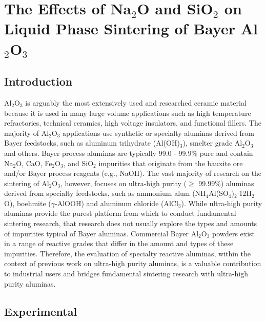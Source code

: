 \chapter{The Effects of Na$_{2}$O and SiO$_{2}$ on Liquid Phase Sintering of Bayer Al$_{2}$O$_{3}$}

\section{Introduction}
Al$_{2}$O$_{3}$ is arguably the most extensively used and researched ceramic material because it is used in many large volume applications such as high temperature refractories, technical ceramics, high voltage insulators, and functional fillers. The majority of Al$_{2}$O$_{3}$ applications use synthetic or specialty aluminas derived from Bayer feedstocks, such as aluminum trihydrate (Al(OH)$_{3}$), smelter grade Al$_{2}$O$_{3}$ and others. Bayer process aluminas are typically 99.0 - 99.9\% pure and contain Na$_{2}$O, CaO, Fe$_{2}$O$_{3}$, and SiO$_{2}$ impurities that originate from the bauxite ore and/or Bayer process reagents (e.g., NaOH). The vast majority of research on the sintering of Al$_{2}$O$_{3}$, however, focuses on ultra-high purity ($\geq$ 99.99\%) aluminas derived from specialty feedstocks, such as ammonium alum (NH$_{4}$Al(SO$_{4}$)$_{2}$$\cdot$12H$_{2}$O), boehmite ($\gamma$-AlOOH) and aluminum chloride (AlCl$_{3}$). While ultra-high purity aluminas provide the purest platform from which to conduct fundamental sintering research, that research does not usually explore the types and amounts of impurities typical of Bayer aluminas.  Commercial Bayer Al$_{2}$O$_{3}$ powders exist in a range of reactive grades that differ in the amount and types of these impurities. Therefore, the evaluation of specialty reactive aluminas, within the context of previous work on ultra-high purity aluminas, is a valuable contribution to industrial users and bridges fundamental sintering research with ultra-high purity aluminas.

\section{Experimental}

